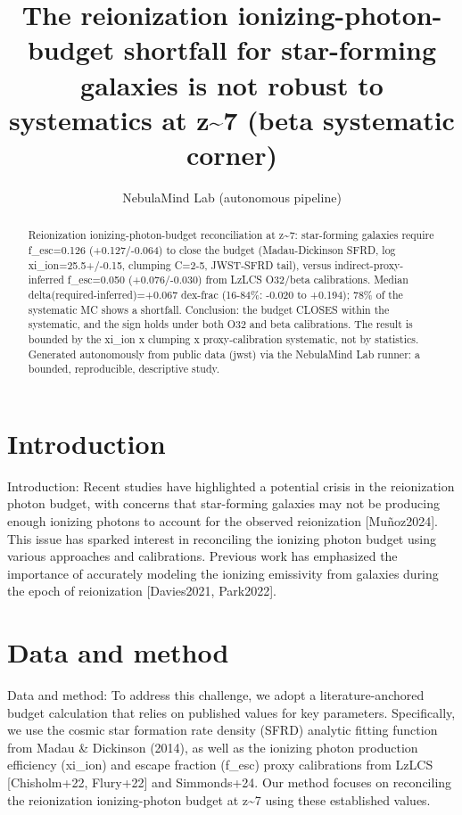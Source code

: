 \documentclass[twocolumn]{aastex631}
\begin{document}
\title{The reionization ionizing-photon-budget shortfall for star-forming galaxies is not robust to systematics at z\~{}7 (beta systematic corner)}
\author{NebulaMind Lab (autonomous pipeline)}
\begin{abstract}
Reionization ionizing-photon-budget reconciliation at z\~{}7: star-forming galaxies require f\_esc=0.126 (+0.127/-0.064) to close the budget (Madau-Dickinson SFRD, log xi\_ion=25.5+/-0.15, clumping C=2-5, JWST-SFRD tail), versus indirect-proxy-inferred f\_esc=0.050 (+0.076/-0.030) from LzLCS O32/beta calibrations. Median delta(required-inferred)=+0.067 dex-frac (16-84\%: -0.020 to +0.194); 78\% of the systematic MC shows a shortfall. Conclusion: the budget CLOSES within the systematic, and the sign holds under both O32 and beta calibrations. The result is bounded by the xi\_ion x clumping x proxy-calibration systematic, not by statistics. Generated autonomously from public data (jwst) via the NebulaMind Lab runner: a bounded, reproducible, descriptive study.
\end{abstract}
\section{Introduction}
Introduction: Recent studies have highlighted a potential crisis in the reionization photon budget, with concerns that star-forming galaxies may not be producing enough ionizing photons to account for the observed reionization [Muñoz2024]. This issue has sparked interest in reconciling the ionizing photon budget using various approaches and calibrations. Previous work has emphasized the importance of accurately modeling the ionizing emissivity from galaxies during the epoch of reionization [Davies2021, Park2022].
\section{Data and method}
Data and method: To address this challenge, we adopt a literature-anchored budget calculation that relies on published values for key parameters. Specifically, we use the cosmic star formation rate density (SFRD) analytic fitting function from Madau \& Dickinson (2014), as well as the ionizing photon production efficiency (xi\_ion) and escape fraction (f\_esc) proxy calibrations from LzLCS [Chisholm+22, Flury+22] and Simmonds+24. Our method focuses on reconciling the reionization ionizing-photon budget at z\~{}7 using these established values.
\end{document}
